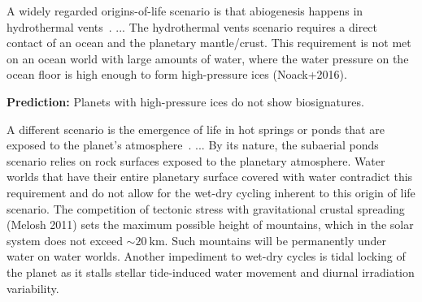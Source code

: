 \documentclass[modern,linenumbers]{aastex631}
\begin{document}
A widely regarded origins-of-life scenario is that abiogenesis happens in hydrothermal vents~\citep[e.g.,][]{Russel2010}.
...
The hydrothermal vents scenario requires a direct contact of an ocean and the planetary mantle/crust.
This requirement is not met on an ocean world with large amounts of water, where the water pressure on the ocean floor is high enough to form high-pressure ices (Noack+2016). %

\textbf{Prediction:} Planets with high-pressure ices do not show biosignatures.

A different scenario is the emergence of life in hot springs or ponds that are exposed to the planet's atmosphere~\citep[e.g.,][]{Deamer2019}.
...
By its nature, the subaerial ponds scenario relies on rock surfaces exposed to the planetary atmosphere.
Water worlds that have their entire planetary surface covered with water contradict this requirement and do not allow for the wet-dry cycling inherent to this origin of life scenario.
The competition of tectonic stress with gravitational crustal spreading (Melosh 2011) sets the maximum possible height of mountains, which in the solar system does not exceed $\sim \SI{20}{\kilo\meter}$.
Such mountains will be permanently under water on water worlds.
Another impediment to wet-dry cycles is tidal locking of the planet as it stalls stellar tide-induced water movement and diurnal irradiation variability.
\end{document}
